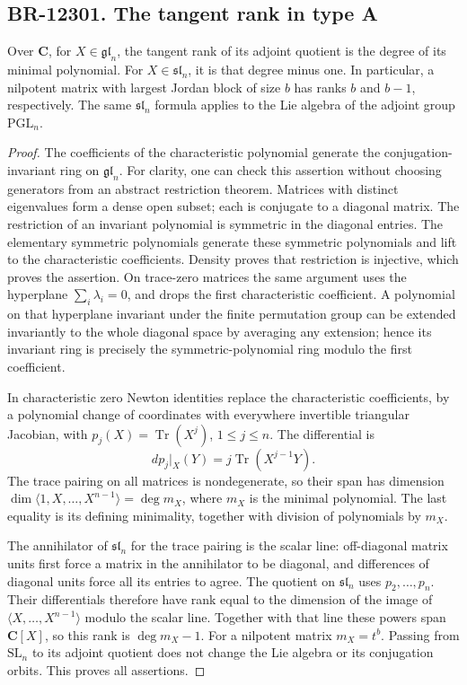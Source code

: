 \subsection{BR-12301. The tangent rank in type A}
Over \(\mathbf C\), for \(X\in\mathfrak{gl}_n\), the tangent
rank of its adjoint quotient is the degree of its minimal
polynomial. For \(X\in\mathfrak{sl}_n\), it is that degree
minus one. In particular, a nilpotent matrix with largest
Jordan block of size \(b\) has ranks \(b\) and \(b-1\),
respectively. The same \(\mathfrak{sl}_n\) formula applies
to the Lie algebra of the adjoint group \(\mathrm{PGL}_n\).

\begin{proof}
The coefficients of the characteristic polynomial generate
the conjugation-invariant ring on \(\mathfrak{gl}_n\).
For clarity, one can check this assertion without choosing
generators from an abstract restriction theorem. Matrices
with distinct eigenvalues form a dense open subset; each is
conjugate to a diagonal matrix. The restriction of an
invariant polynomial is symmetric in the diagonal entries.
The elementary symmetric polynomials generate these symmetric
polynomials and lift to the characteristic coefficients.
Density proves that restriction is injective, which proves
the assertion. On trace-zero matrices the same argument uses
the hyperplane \(\sum_i\lambda_i=0\), and drops the first
characteristic coefficient. A polynomial on that hyperplane
invariant under the finite permutation group can be extended
invariantly to the whole diagonal space by averaging any
extension; hence its invariant ring is precisely the
symmetric-polynomial ring modulo the first coefficient.

In characteristic zero Newton identities replace the
characteristic coefficients, by a polynomial change of
coordinates with everywhere invertible triangular Jacobian,
with \(p_j(X)=\operatorname{Tr}(X^j)\), \(1\leq j\leq n\).
The differential is
\[
 dp_j|_X(Y)=j\operatorname{Tr}(X^{j-1}Y).
\]
The trace pairing on all matrices is nondegenerate, so their
span has dimension
\(\dim\langle 1,X,\ldots,X^{n-1}\rangle=\deg m_X\),
where \(m_X\) is the minimal polynomial. The last equality
is its defining minimality, together with division of
polynomials by \(m_X\).

The annihilator of \(\mathfrak{sl}_n\) for the trace pairing
is the scalar line: off-diagonal matrix units first force
a matrix in the annihilator to be diagonal, and differences
of diagonal units force all its entries to agree. The
quotient on \(\mathfrak{sl}_n\) uses \(p_2,\ldots,p_n\).
Their differentials therefore have rank equal to the
dimension of the image of \(\langle X,\ldots,X^{n-1}\rangle\)
modulo the scalar line. Together with that line these
powers span \(\mathbf C[X]\), so this rank is
\(\deg m_X-1\). For a nilpotent matrix \(m_X=t^b\).
Passing from \(\mathrm{SL}_n\) to its adjoint quotient
does not change the Lie algebra or its conjugation orbits.
This proves all assertions.
\end{proof}

